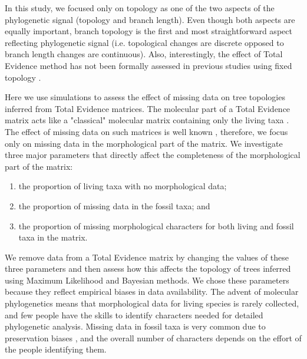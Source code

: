 \documentclass[12pt,letterpaper]{article}
\begin{document}
In this study, we focused only on topology as one of the two aspects of the phylogenetic signal (topology and branch length).
Even though both aspects are equally important, branch topology is the first and most straightforward aspect reflecting phylogenetic signal (i.e. topological changes are discrete opposed to branch length changes are continuous).
Also, interestingly, the effect of Total Evidence method has not been formally assessed in previous studies using fixed topology \citep{ronquista2012,schragocombining2013}. %

Here we use simulations to assess the effect of missing data on tree topologies inferred from Total Evidence matrices.
The molecular part of a Total Evidence matrix acts like a "classical" molecular matrix containing only the living taxa \citep{ronquista2012}.
The effect of missing data on such matrices is well known \citep{wiensmissing2006,wiensmissing2008,rouresite-specific2011}, therefore, we focus only on missing data in the morphological part of the matrix.
We investigate three major parameters that directly affect the completeness of the morphological part of the matrix:
\begin{enumerate}
\item the proportion of living taxa with no morphological data;
\item the proportion of missing data in the fossil taxa; and
\item the proportion of missing morphological characters for both living and fossil taxa in the matrix.
\end{enumerate}
We remove data from a Total Evidence matrix by changing the values of these three parameters and then assess how this affects the topology of trees inferred using Maximum Likelihood and Bayesian methods.
We chose these parameters because they reflect empirical biases in data availability.
The advent of molecular phylogenetics means that morphological data for living species is rarely collected, and few people have the skills to identify characters needed for detailed phylogenetic analysis.
Missing data in fossil taxa is very common due to preservation biases \citep{sansomfossilization2013}, and the overall number of characters depends on the effort of the people identifying them.
\end{document}
